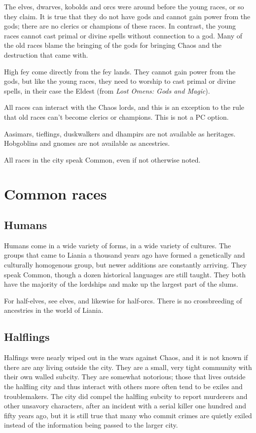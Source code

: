 \documentclass{report}
\begin{document}
The elves, dwarves, kobolds and orcs were around before the young races, or so they claim.
It is true that they do not have gods and cannot gain power from the gods; there
are no clerics or champions of these races. In contrast, the young races cannot
cast primal or divine spells without connection to a god. Many of the old races
blame the bringing of the gods for bringing Chaos and the destruction that came with.

High fey come directly from the fey lands. They cannot gain power from the gods, but like the young
races, they need to worship to cast primal or divine spells, in their case
the Eldest (from \emph{Lost Omens: Gods and Magic}).

All races can interact with the Chaos lords, and this is an exception to the
rule that old races can't become clerics or champions. This is not a PC option.

Aasimars, tieflings, duskwalkers and dhampirs are not available as heritages.
Hobgoblins and gnomes are not available as ancestries.

All races in the city speak Common, even if not otherwise noted.

\section {Common races}

\subsection{Humans}

Humans come in a wide variety of forms, in a wide variety of cultures. The
groups that came to Liania a thousand years ago have formed a genetically and
culturally homogenous group, but newer additions are constantly arriving. They
speak Common, though a dozen historical languages are still taught. They both
have the majority of the lordships and make up the largest part of the slums.

For half-elves, see elves, and likewise for half-orcs. There is no crossbreeding
of ancestries in the world of Liania.

\subsection{Halflings}

Halfings were nearly wiped out in the wars against Chaos, and it is not known
if there are any living outside the city. They are a small, very tight community
with their own walled subcity. They are somewhat notorious; those that lives
outside the halfling city and thus interact with others more often tend to be
exiles and troublemakers. The city did compel the halfling subcity to report
murderers and other unsavory characters, after an incident with a serial killer
one hundred and fifty years ago, but it is still true that many who commit crimes
are quietly exiled instead of the information being passed to the larger city.
\end{document}
